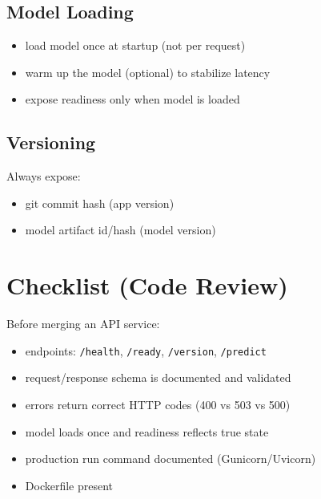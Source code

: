 \documentclass[11pt]{article}
\begin{document}
\subsection{Model Loading}
\begin{itemize}
  \item load model once at startup (not per request)
  \item warm up the model (optional) to stabilize latency
  \item expose readiness only when model is loaded
\end{itemize}

\subsection{Versioning}
Always expose:
\begin{itemize}
  \item git commit hash (app version)
  \item model artifact id/hash (model version)
\end{itemize}

\section{Checklist (Code Review)}
Before merging an API service:
\begin{itemize}
  \item endpoints: \texttt{/health}, \texttt{/ready}, \texttt{/version}, \texttt{/predict}
  \item request/response schema is documented and validated
  \item errors return correct HTTP codes (400 vs 503 vs 500)
  \item model loads once and readiness reflects true state
  \item production run command documented (Gunicorn/Uvicorn)
  \item Dockerfile present
\end{itemize}
\end{document}
